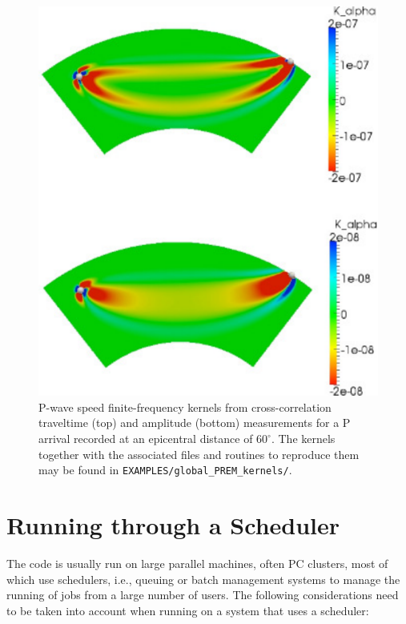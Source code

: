\documentclass[oneside,english]{book}
\begin{document}
%
\begin{figure}[H]
\noindent \begin{centering}
\includegraphics[clip,scale=1.2]{figures/P_alpha_60d_17s}
\caption{\label{fig:P-wave-speed-finite-frequency}P-wave speed finite-frequency
kernels from cross-correlation traveltime (top) and amplitude (bottom) measurements for a P arrival recorded at an epicentral distance of $60^{\circ}$. The kernels together with the associated files and routines to reproduce them may be found in \texttt{EXAMPLES/global\_PREM\_kernels/}.}
\par\end{centering}
\end{figure}



\chapter{\label{cha:Running-Scheduler}Running through a Scheduler}

The code is usually run on large parallel machines, often PC clusters,
most of which use schedulers, i.e., queuing or batch management systems
to manage the running of jobs from a large number of users. The following
considerations need to be taken into account when running on a system
that uses a scheduler:
\end{document}
